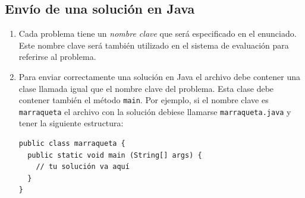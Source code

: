 \documentclass[12pt]{oci}
\begin{document}

\subsection*{Envío de una solución en Java}

\begin{enumerate}
  \item Cada problema tiene un \emph{nombre clave} que será especificado en el
    enunciado.
    Este nombre clave será también utilizado en el sistema de evaluación
    para referirse al problema.
  \item Para enviar correctamente una solución en Java el archivo debe contener
    una clase llamada igual que el nombre clave del problema.
    Esta clase debe contener también el método \verb+main+.
    Por ejemplo, si el nombre clave es \texttt{marraqueta} el archivo con la
    solución debiese llamarse \texttt{marraqueta.java} y tener la siguiente
    estructura:

\begin{verbatim}
public class marraqueta {
  public static void main (String[] args) {
    // tu solución va aquí
  }
}
\end{verbatim}
\end{enumerate}
\end{document}
